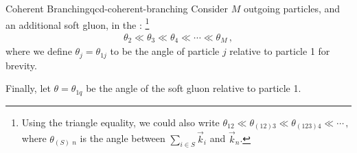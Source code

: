 \begin{lemma}{Coherent Branching}{qcd-coherent-branching}
    Consider \(M\) outgoing particles, and an additional soft gluon, in the :%
    \footnote{
        Using the triangle equality, we could also write
        \(
            \theta_{12} \ll \theta_{(12)3} \ll \theta_{(123)4} \ll \cdots
            \,,
        \)
        where \(\theta_{(S)\,\,n}\) is the angle between \(\sum_{i\in S} \vec{k}_i\) and \(\vec{k}_n\).
    }
    \begin{align}
        \theta_{2} \ll \theta_{3} \ll \theta_{4}
        \ll
        \cdots
        \ll
        \theta_M
        \,,
    \end{align}
    where we define \(\theta_j = \theta_{1j}\) to be the angle of particle \(j\) relative to particle 1 for brevity.

    Finally, let \(\theta = \theta_{1q}\) be the angle of the soft gluon relative to particle 1.



\end{lemma}
